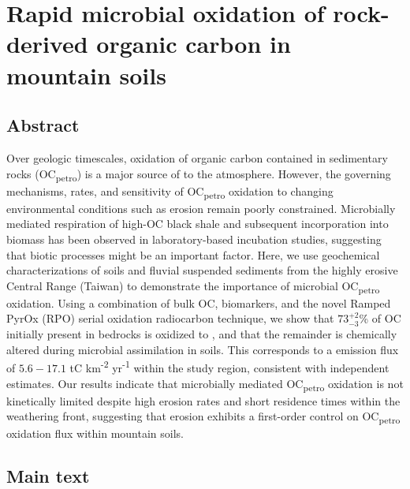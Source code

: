 \chapter{Rapid microbial oxidation of rock-derived organic carbon in mountain soils}
\label{Ch6}
\raggedbottom

{\let\thefootnote\relax{}}

\clearpage

\section{Abstract}

Over geologic timescales, oxidation of organic carbon contained in sedimentary rocks (OC\textsubscript{petro}) is a major source of  to the atmosphere. However, the governing mechanisms, rates, and sensitivity of OC\textsubscript{petro} oxidation to changing environmental conditions such as erosion remain poorly constrained. Microbially mediated respiration of high-OC black shale and subsequent incorporation into biomass has been observed in laboratory-based incubation studies, suggesting that biotic processes might be an important factor. Here, we use geochemical characterizations of soils and fluvial suspended sediments from the highly erosive Central Range (Taiwan) to demonstrate the importance of microbial OC\textsubscript{petro} oxidation. Using a combination of bulk OC, biomarkers, and the novel Ramped PyrOx (RPO) serial oxidation radiocarbon technique, we show that $73^{+2}_{-3}$\% of OC initially present in bedrocks is oxidized to , and that the remainder is chemically altered during microbial assimilation in soils. This corresponds to a  emission flux of $5.6 - 17.1$ tC km\textsuperscript{-2} yr\textsuperscript{-1} within the study region, consistent with independent estimates. Our results indicate that microbially mediated OC\textsubscript{petro} oxidation is not kinetically limited despite high erosion rates and short residence times within the weathering front, suggesting that erosion exhibits a first-order control on OC\textsubscript{petro} oxidation flux within mountain soils.

\section{Main text}

